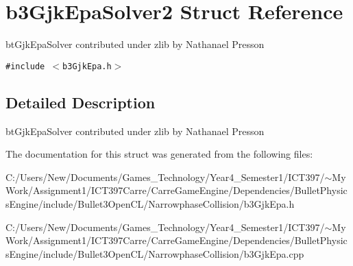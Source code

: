 \hypertarget{structb3_gjk_epa_solver2}{
\section{b3GjkEpaSolver2 Struct Reference}
\label{structb3_gjk_epa_solver2}
}
btGjkEpaSolver contributed under zlib by Nathanael Presson  


{\tt \#include $<$b3GjkEpa.h$>$}



\subsection{Detailed Description}
btGjkEpaSolver contributed under zlib by Nathanael Presson 

The documentation for this struct was generated from the following files:\begin{CompactItemize}
\item 
C:/Users/New/Documents/Games\_\-Technology/Year4\_\-Semester1/ICT397/$\sim$My Work/Assignment1/ICT397Carre/CarreGameEngine/Dependencies/BulletPhysicsEngine/include/Bullet3OpenCL/NarrowphaseCollision/b3GjkEpa.h\item 
C:/Users/New/Documents/Games\_\-Technology/Year4\_\-Semester1/ICT397/$\sim$My Work/Assignment1/ICT397Carre/CarreGameEngine/Dependencies/BulletPhysicsEngine/include/Bullet3OpenCL/NarrowphaseCollision/b3GjkEpa.cpp\end{CompactItemize}
